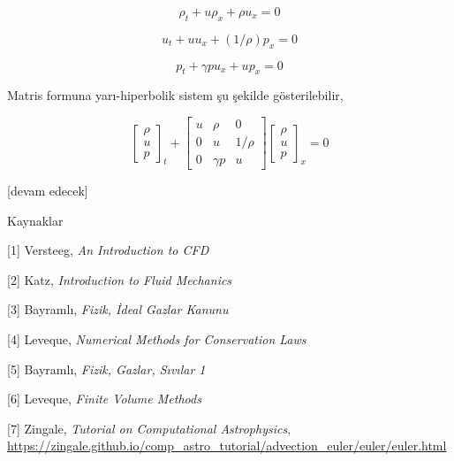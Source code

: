 \documentclass[12pt,fleqn]{article}\usepackage{../../common}
\begin{document}
$$
\rho_t + u \rho_x + \rho u_x = 0
$$

$$
u_t + uu_x + (1/\rho) p_x = 0
$$

$$
p_t + \gamma p u_x + u p_x = 0
$$

Matris formuna yarı-hiperbolik sistem şu şekilde gösterilebilir,

$$
\left[\begin{array}{c}
\rho \\ u \\ p
\end{array}\right]_t +
\left[\begin{array}{ccc}
u & \rho & 0 \\
0 & u & 1/\rho \\
0 & \gamma p & u
\end{array}\right]
\left[\begin{array}{c}
\rho \\ u \\ p
\end{array}\right]_x
= 0
$$



[devam edecek]

Kaynaklar

[1] Versteeg, {\em An Introduction to CFD}

[2] Katz, {\em Introduction to Fluid Mechanics}

[3] Bayramlı, {\em Fizik, İdeal Gazlar Kanunu}

[4] Leveque, {\em Numerical Methods for Conservation Laws}

[5] Bayramlı, {\em Fizik, Gazlar, Sıvılar 1}

[6] Leveque, {\em Finite Volume Methods}

[7] Zingale, {\em Tutorial on Computational Astrophysics},
    \url{https://zingale.github.io/comp_astro_tutorial/advection_euler/euler/euler.html}
\end{document}
